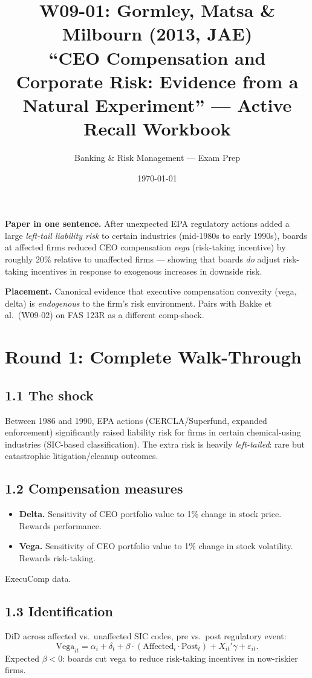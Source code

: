 \documentclass[11pt]{article}
\title{W09-01: Gormley, Matsa \& Milbourn (2013, JAE) \\
\large ``CEO Compensation and Corporate Risk: Evidence from a Natural Experiment'' --- Active Recall Workbook}
\author{Banking \& Risk Management --- Exam Prep}
\date{\today}
\begin{document}
\maketitle

\begin{keybox}
\textbf{Paper in one sentence.} After unexpected EPA regulatory actions added a large \emph{left-tail liability risk} to certain industries (mid-1980s to early 1990s), boards at affected firms reduced CEO compensation \emph{vega} (risk-taking incentive) by roughly 20\% relative to unaffected firms --- showing that boards \emph{do} adjust risk-taking incentives in response to exogenous increases in downside risk.

\textbf{Placement.} Canonical evidence that executive compensation convexity (vega, delta) is \emph{endogenous} to the firm's risk environment. Pairs with Bakke et al.\ (W09-02) on FAS 123R as a different comp-shock.
\end{keybox}

\section*{Round 1: Complete Walk-Through}

\subsection*{1.1 The shock}
Between 1986 and 1990, EPA actions (CERCLA/Superfund, expanded enforcement) significantly raised liability risk for firms in certain chemical-using industries (SIC-based classification). The extra risk is heavily \emph{left-tailed}: rare but catastrophic litigation/cleanup outcomes.

\subsection*{1.2 Compensation measures}
\begin{itemize}
\item \textbf{Delta.} Sensitivity of CEO portfolio value to 1\% change in stock price. Rewards performance.
\item \textbf{Vega.} Sensitivity of CEO portfolio value to 1\% change in stock volatility. Rewards risk-taking.
\end{itemize}
ExecuComp data.

\subsection*{1.3 Identification}
DiD across affected vs.\ unaffected SIC codes, pre vs.\ post regulatory event:
\[
\text{Vega}_{it}=\alpha_i+\delta_t+\beta\cdot(\text{Affected}_i\cdot\text{Post}_t)+X_{it}'\gamma+\varepsilon_{it}.
\]
Expected $\beta<0$: boards cut vega to reduce risk-taking incentives in now-riskier firms.
\end{document}
